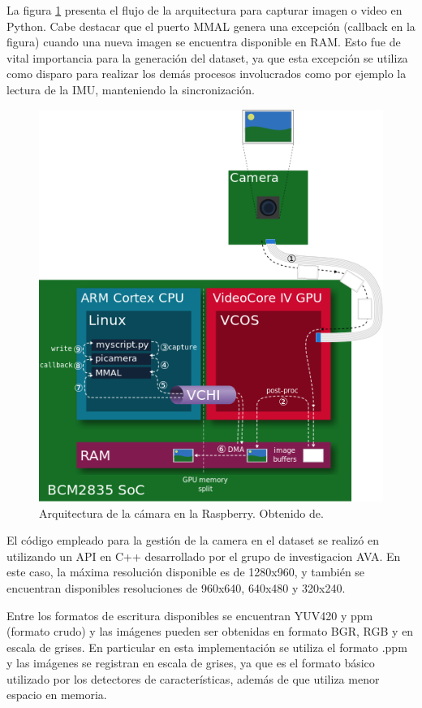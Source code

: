 La figura \ref{imagen:ArquitecturaCamara} presenta el flujo de la arquitectura para capturar imagen o video en Python. Cabe destacar que el puerto MMAL genera una excepción (callback en la figura) cuando una nueva imagen se encuentra disponible en RAM. Esto fue de vital importancia para la generación del dataset, ya que esta excepción se utiliza como disparo para realizar los demás procesos involucrados como por ejemplo la lectura de la IMU, manteniendo la sincronización.


\begin{figure}[H]
	\centering		\includegraphics[width=0.7\linewidth]{imagenes/prototipo/camera_architecture}
	\caption{Arquitectura de la cámara en la Raspberry. Obtenido de\protect\footnotemark.}
	\label{imagen:ArquitecturaCamara}

\end{figure}

El código empleado para la gestión de la camera en el dataset se realizó en  utilizando un API en C++ desarrollado por el grupo de investigacion AVA\protect\footnotemark. En este caso, la máxima resolución disponible es de 1280x960, y también se encuentran disponibles resoluciones de 960x640, 640x480 y 320x240.

Entre los formatos de escritura disponibles se encuentran YUV420 y ppm (formato crudo) y las imágenes pueden ser obtenidas en formato BGR, RGB y en escala de grises. En particular en esta implementación se utiliza el formato .ppm y las imágenes se registran en escala de grises, ya que es el formato básico utilizado por los detectores  de características, además de que utiliza menor espacio en memoria.

